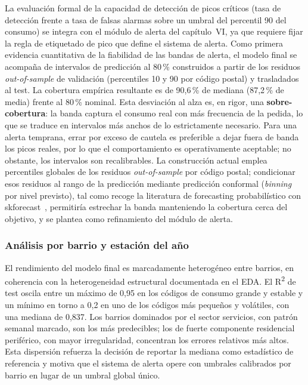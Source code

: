 \documentclass[12pt, a4paper]{article}
\begin{document}
La evaluación formal de la capacidad de detección de picos críticos (tasa de detección frente a tasa de falsas alarmas sobre un umbral del percentil 90 del consumo) se integra con el módulo de alerta del capítulo~VI, ya que requiere fijar la regla de etiquetado de pico que define el sistema de alerta. Como primera evidencia cuantitativa de la fiabilidad de las bandas de alerta, el modelo final se acompaña de intervalos de predicción al 80\,\% construidos a partir de los residuos \textit{out-of-sample} de validación (percentiles 10 y 90 por código postal) y trasladados al test. La cobertura empírica resultante es de 90,6\,\% de mediana (87,2\,\% de media) frente al 80\,\% nominal. Esta desviación al alza es, en rigor, una \textbf{sobre-cobertura}: la banda captura el consumo real con más frecuencia de la pedida, lo que se traduce en intervalos más anchos de lo estrictamente necesario. Para una alerta temprana, errar por exceso de cautela es preferible a dejar fuera de banda los picos reales, por lo que el comportamiento es operativamente aceptable; no obstante, los intervalos son recalibrables. La construcción actual emplea percentiles globales de los residuos \textit{out-of-sample} por código postal; condicionar esos residuos al rango de la predicción mediante predicción conformal (\textit{binning} por nivel previsto), tal como recoge la literatura de forecasting probabilístico con skforecast~\cite{skforecast}, permitiría estrechar la banda manteniendo la cobertura cerca del objetivo, y se plantea como refinamiento del módulo de alerta.

\subsubsection{Análisis por barrio y estación del año}

El rendimiento del modelo final es marcadamente heterogéneo entre barrios, en coherencia con la heterogeneidad estructural documentada en el EDA. El R\textsuperscript{2} de test oscila entre un máximo de 0,95 en los códigos de consumo grande y estable y un mínimo en torno a 0,2 en uno de los códigos más pequeños y volátiles, con una mediana de 0,837. Los barrios dominados por el sector servicios, con patrón semanal marcado, son los más predecibles; los de fuerte componente residencial periférico, con mayor irregularidad, concentran los errores relativos más altos. Esta dispersión refuerza la decisión de reportar la mediana como estadístico de referencia y motiva que el sistema de alerta opere con umbrales calibrados por barrio en lugar de un umbral global único.
\end{document}
